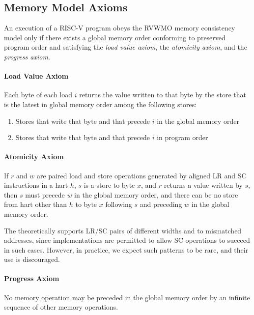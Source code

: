 \subsection*{Memory Model Axioms}

An execution of a RISC-V program obeys the RVWMO memory consistency model only if there exists a global memory order conforming to preserved program order and satisfying the {\em load value axiom}, the {\em atomicity axiom}, and the {\em progress axiom}.

\newcommand{\loadvalueaxiom}{
  Each byte of each load $i$ returns the value written to that byte by the store that is the latest in global memory order among the following stores:
  \begin{enumerate}
    \item Stores that write that byte and that precede $i$ in the global memory order
    \item Stores that write that byte and that precede $i$ in program order
  \end{enumerate}
}

\newcommand{\atomicityaxiom}{If $r$ and $w$ are paired load and store operations generated by aligned LR and SC instructions in a hart $h$, $s$ is a store to byte $x$, and $r$ returns a value written by $s$, then $s$ must precede $w$ in the global memory order, and there can be no store from hart other than $h$ to byte $x$ following $s$ and preceding $w$ in the global memory order.}

\newcommand{\progressaxiom}{No memory operation may be preceded in the global memory order by an infinite sequence of other memory operations.}

\paragraph{Load Value Axiom}
\label{rvwmo:ax:load}
\loadvalueaxiom

\paragraph{Atomicity Axiom}
\label{rvwmo:ax:atom}
\atomicityaxiom

\begin{commentary}
  The  theoretically supports LR/SC pairs of different widths and to mismatched addresses, since implementations are permitted to allow SC operations to succeed in such cases.  However, in practice, we expect such patterns to be rare, and their use is discouraged.
\end{commentary}

\paragraph{Progress Axiom}
\label{rvwmo:ax:prog}
\progressaxiom


